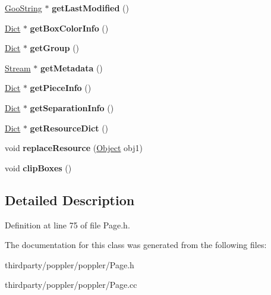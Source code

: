 \begin{DoxyCompactItemize}
\item 
\mbox{\label{class_page_attrs_adb22879017fb85cc4013824e90bbf896}} 
\hyperlink{class_goo_string}{Goo\+String} $\ast$ {\bfseries get\+Last\+Modified} ()
\item 
\mbox{\label{class_page_attrs_a60225c75eff1b6f226384fc022cc7c68}} 
\hyperlink{class_dict}{Dict} $\ast$ {\bfseries get\+Box\+Color\+Info} ()
\item 
\mbox{\label{class_page_attrs_a7c12ec33390599445eb5da969ac8b3d3}} 
\hyperlink{class_dict}{Dict} $\ast$ {\bfseries get\+Group} ()
\item 
\mbox{\label{class_page_attrs_aae16bb64290a25b11e7baeb73af840f3}} 
\hyperlink{class_stream}{Stream} $\ast$ {\bfseries get\+Metadata} ()
\item 
\mbox{\label{class_page_attrs_a4b07246e2a9446e36b6152aa568bee37}} 
\hyperlink{class_dict}{Dict} $\ast$ {\bfseries get\+Piece\+Info} ()
\item 
\mbox{\label{class_page_attrs_aa5fe8e3c51359c45d06eb4b063325aaa}} 
\hyperlink{class_dict}{Dict} $\ast$ {\bfseries get\+Separation\+Info} ()
\item 
\mbox{\label{class_page_attrs_a19b213602460228571c52a099b32783e}} 
\hyperlink{class_dict}{Dict} $\ast$ {\bfseries get\+Resource\+Dict} ()
\item 
\mbox{\label{class_page_attrs_abf23b966f4067d866c33a1551953301d}} 
void {\bfseries replace\+Resource} (\hyperlink{class_object}{Object} obj1)
\item 
\mbox{\label{class_page_attrs_a5a74db99d9b9c9ffa8a8363e79fedd33}} 
void {\bfseries clip\+Boxes} ()
\end{DoxyCompactItemize}


\subsection{Detailed Description}


Definition at line 75 of file Page.\+h.



The documentation for this class was generated from the following files\+:\begin{DoxyCompactItemize}
\item 
thirdparty/poppler/poppler/Page.\+h\item 
thirdparty/poppler/poppler/Page.\+cc\end{DoxyCompactItemize}
